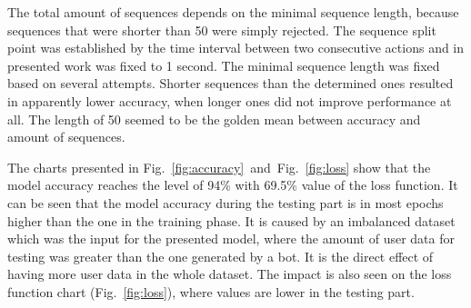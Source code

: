 The total amount of sequences depends on the minimal sequence length, because sequences that were shorter than 50 were simply rejected.
The sequence split point was established by the time interval between two consecutive actions and in presented work was fixed to 1 second.
The minimal sequence length was fixed based on several attempts.
Shorter sequences than the determined ones resulted in apparently lower accuracy, when longer ones did not improve performance at all.
The length of 50 seemed to be the golden mean between accuracy and amount of sequences.

The charts presented in \mbox{Fig.~\ref{fig:accuracy} and Fig.~\ref{fig:loss}} show that the model accuracy reaches the level of 94\% with 69.5\% value of the loss function.
It can be seen that the model accuracy during the testing part is in most epochs higher than the one in the training phase.
It is caused by an imbalanced dataset which was the input for the presented model, where
the amount of user data for testing was greater than the one generated by a bot.
It is the direct effect of having more user data in the whole dataset.
The impact is also seen on the loss function chart \mbox{(Fig.~\ref{fig:loss})}, where values are lower in the testing part.

